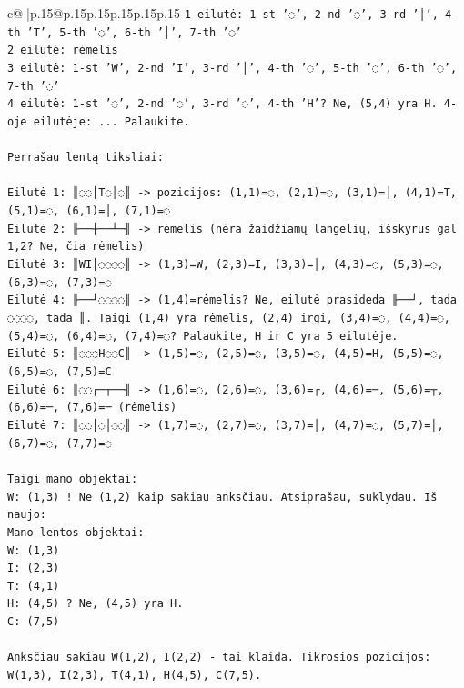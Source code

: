 \documentclass{article}
\begin{document}
{\begin{supertabular}{c@{$\;$}|p{.15\linewidth}@{}p{.15\linewidth}p{.15\linewidth}p{.15\linewidth}p{.15\linewidth}p{.15\linewidth}}
{{{\texttt{1 eilutė: 1{-}st '◌', 2{-}nd '◌', 3{-}rd '│', 4{-}th 'T', 5{-}th '◌', 6{-}th '│', 7{-}th '◌'} \\
\texttt{2 eilutė: rėmelis} \\
\texttt{3 eilutė: 1{-}st 'W', 2{-}nd 'I', 3{-}rd '│', 4{-}th '◌', 5{-}th '◌', 6{-}th '◌', 7{-}th '◌'} \\
\texttt{4 eilutė: 1{-}st '◌', 2{-}nd '◌', 3{-}rd '◌', 4{-}th 'H'? Ne, (5,4) yra H. 4{-}oje eilutėje: ... Palaukite.} \\
\\ 
\texttt{Perrašau lentą tiksliai:} \\
\\ 
\texttt{Eilutė 1: ║◌◌│T◌│◌║  {-}> pozicijos: (1,1)=◌, (2,1)=◌, (3,1)=│, (4,1)=T, (5,1)=◌, (6,1)=│, (7,1)=◌} \\
\texttt{Eilutė 2: ╟──┼──┴─╢ {-}> rėmelis (nėra žaidžiamų langelių, išskyrus gal 1,2? Ne, čia rėmelis)} \\
\texttt{Eilutė 3: ║WI│◌◌◌◌║ {-}> (1,3)=W, (2,3)=I, (3,3)=│, (4,3)=◌, (5,3)=◌, (6,3)=◌, (7,3)=◌} \\
\texttt{Eilutė 4: ╟──┘◌◌◌◌║ {-}> (1,4)=rėmelis? Ne, eilutė prasideda ╟──┘, tada ◌◌◌◌, tada ║. Taigi (1,4) yra rėmelis, (2,4) irgi, (3,4)=◌, (4,4)=◌, (5,4)=◌, (6,4)=◌, (7,4)=◌? Palaukite, H ir C yra 5 eilutėje.} \\
\texttt{Eilutė 5: ║◌◌◌H◌◌C║ {-}> (1,5)=◌, (2,5)=◌, (3,5)=◌, (4,5)=H, (5,5)=◌, (6,5)=◌, (7,5)=C} \\
\texttt{Eilutė 6: ║◌◌┌─┬──╢ {-}> (1,6)=◌, (2,6)=◌, (3,6)=┌, (4,6)=─, (5,6)=┬, (6,6)=─, (7,6)=─  (rėmelis)} \\
\texttt{Eilutė 7: ║◌◌│◌│◌◌║ {-}> (1,7)=◌, (2,7)=◌, (3,7)=│, (4,7)=◌, (5,7)=│, (6,7)=◌, (7,7)=◌} \\
\\ 
\texttt{Taigi mano objektai:} \\
\texttt{W: (1,3) ! Ne (1,2) kaip sakiau anksčiau. Atsiprašau, suklydau. Iš naujo:} \\
\texttt{Mano lentos objektai:} \\
\texttt{W: (1,3)} \\
\texttt{I: (2,3)} \\
\texttt{T: (4,1)} \\
\texttt{H: (4,5) ? Ne, (4,5) yra H.} \\
\texttt{C: (7,5)} \\
\\ 
\texttt{Anksčiau sakiau W(1,2), I(2,2) {-} tai klaida. Tikrosios pozicijos: W(1,3), I(2,3), T(4,1), H(4,5), C(7,5).} \\
}}}
\end{supertabular}}
\end{document}
